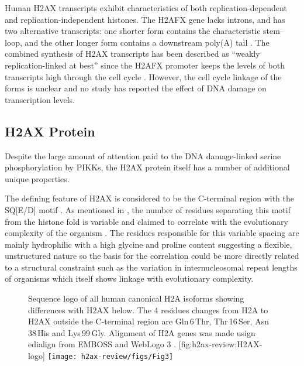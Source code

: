 Human H2AX transcripts exhibit characteristics of both
replication-dependent and replication-independent histones. The H2AFX
gene lacks introns, and has two alternative transcripts: one shorter
form contains the characteristic stem--loop, and the other longer form
contains a downstream poly(A) tail \citep{HTwoAX-transcripts}
. The combined synthesis of H2AX
transcripts has been described as ``weakly replication-linked at
best'' since the H2AFX promoter keeps the levels of both transcripts
high through the cell cycle \citep{VSI94}. However, the cell cycle
linkage of the forms is unclear and no study has reported the effect
of DNA damage on transcription levels.

\subsection{H2AX Protein}
\label{subsec:h2ax-review:H2AX-protein}
Despite the large amount of attention paid to the DNA damage-linked
serine phosphorylation by PIKKs, the H2AX protein itself has a number
of additional unique properties.

The defining feature of H2AX is considered to be the C-terminal
region with the SQ[E/D]\textPhi{} motif
. As mentioned in
, the number of residues
separating this motif from the histone fold is variable and claimed to
correlate with the evolutionary complexity of the organism
\citep{CRDP+02}. The residues responsible for this variable spacing
are mainly hydrophilic with a high glycine and proline content
suggesting a flexible, unstructured nature so the basis for the
correlation could be more directly related to a structural constraint
such as the variation in internucleosomal repeat lengths of organisms
which itself shows linkage with evolutionary complexity.

\begin{figure}
\begin{sidecaption}%
                   {Sequence logo of all human canonical H2A isoforms
                     showing differences with H2AX below. The 4
                     residues changes from H2A to H2AX outside the
                     C-terminal region are Gln\,6\,Thr, Thr\,16\,Ser,
                     Asn\,38\,His and Lys\,99\,Gly. Alignment of H2A
                     genes was made usign edialign
                     \citep{Mor99} from EMBOSS
                     \citep{RLB00} and WebLogo 3
                     \citep{weblogo}.}%
                   [fig:h2ax-review:H2AX-logo]
\centering
\texttt{[image: h2ax-review/figs/Fig3]}
\end{sidecaption}
\end{figure}

